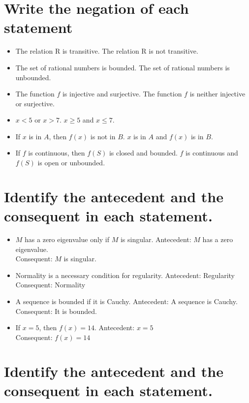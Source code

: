 \documentclass[11pt]{article} %
\begin{document}
\section{Write the negation of each statement}
\begin{itemize}
	\item The relation R is transitive.
	\subitem The relation R is not transitive.
	
	\item The set of rational numbers is bounded.
	\subitem The set of rational numbers is unbounded.
	
	\item The function $f$ is injective and surjective.
	\subitem The function $f$ is neither injective or surjective.
	
	\item $x<5$ or $x>7$.
	\subitem $x \geq 5$ and $x \leq 7$.

	\item If $x$ is in $A$, then $f(x)$ is not in $B$.
	\subitem $x$ is in $A$ and $f(x)$ is in $B$.
	
	\item If $f$ is continuous, then $f(S)$ is closed and bounded.
	\subitem $f$ is continuous and $f(S)$ is open or unbounded.

\end{itemize}

\section{Identify the antecedent and the consequent in each statement.}
\begin{itemize}
	\item $M$ has a zero eigenvalue only if $M$ is singular.
	\subitem Antecedent: $M$ has a zero eigenvalue.\\ Consequent: $M$ is singular.
	
	\item Normality is a necessary condition for regularity.
	\subitem Antecedent: Regularity\\ Consequent: Normality
	
	\item A sequence is bounded if it is Cauchy.
	\subitem Antecedent: A sequence is Cauchy.\\ Consequent: It is bounded.
	
	\item If $x=5$, then $f(x)=14$.
	\subitem Antecedent: $x=5$\\ Consequent: $f(x)=14$
\end{itemize}

\section{Identify the antecedent and the consequent in each statement.}
\end{document}

